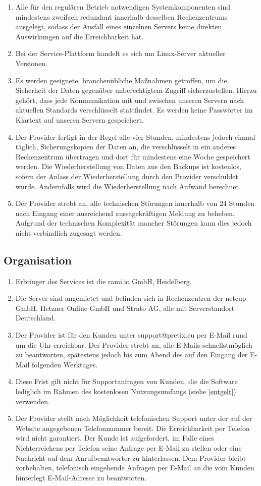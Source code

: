 \documentclass{terms}
\begin{document}
\begin{enumerate}
\item Alle für den regulären Betrieb notwendigen Systemkomponenten sind mindestens zweifach redundant innerhalb desselben Rechenzentrums ausgelegt, sodass der Ausfall eines einzelnen Servers keine direkten Auswirkungen auf die Erreichbarkeit hat.
\item Bei der Service-Plattform handelt es sich um Linux-Server aktueller Versionen.
\item Es werden geeignete, branchenübliche Maßnahmen getroffen, um die Sicherheit der Daten gegenüber unberechtigtem Zugriff sicherzustellen. Hierzu gehört, dass jede Kommunikation mit und zwischen unseren Servern nach aktuellen Standards verschlüsselt stattfindet. Es werden keine Passwörter im Klartext auf unseren Servern gespeichert.
\item Der Provider fertigt in der Regel alle vier Stunden, mindestens jedoch einmal täglich, Sicherungskopien der Daten an, die verschlüsselt in ein anderes Rechenzentrum übertragen und dort für mindestens eine Woche gespeichert werden. Die Wiederherstellung von Daten aus den Backups ist kostenlos, sofern der Anlass der Wiederherstellung durch den Provider verschuldet wurde. Andernfalls wird die Wiederherstellung nach Aufwand berechnet.
\item Der Provider strebt an, alle technischen Störungen innerhalb von 24 Stunden nach Eingang einer ausreichend aussagekräftigen Meldung zu beheben. Aufgrund der technischen Komplexität mancher Störungen kann dies jedoch nicht verbindlich zugesagt werden.
\end{enumerate}

\subsection{Organisation}
\begin{enumerate}
\item Erbringer des Services ist die rami.io GmbH, Heidelberg.
\item Die Server sind angemietet und befinden sich in Rechenzentren der netcup GmbH, Hetzner Online GmbH und Strato AG, alle mit Serverstandort Deutschland.
\item Der Provider ist für den Kunden unter support@pretix.eu per E-Mail rund um die Uhr erreichbar. Der Provider strebt an, alle E-Mails schnellstmöglich zu beantworten, spätestens jedoch bis zum Abend des auf den Eingang der E-Mail folgenden Werktages.
\item Diese Frist gilt nicht für Supportanfragen von Kunden, die die Software lediglich im Rahmen des kostenlosen Nutzungsumfangs (siehe \ref{entgelt}) verwenden.
\item Der Provider stellt nach Möglichkeit telefonischen Support unter der auf der Website angegebenen Telefonnummer bereit. Die Erreichbarkeit per Telefon wird nicht garantiert. Der Kunde ist aufgefordert, im Falle eines Nichterreichens per Telefon seine Anfrage per E-Mail zu stellen oder eine Nachricht auf dem Anrufbeantworter zu hinterlassen. Dem Provider bleibt vorbehalten, telefonisch eingehende Anfragen per E-Mail an die vom Kunden hinterlegt E-Mail-Adresse zu beantworten.
\end{enumerate}
\end{document}
